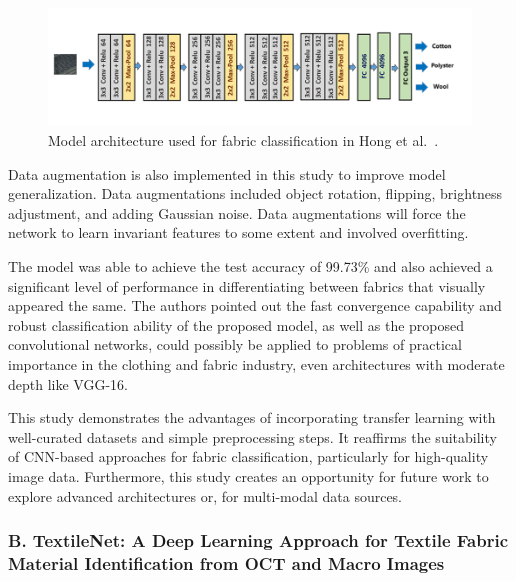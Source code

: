 \begin{figure}[H]
    \centering
    \begin{minipage}{1\linewidth}
        \includegraphics[width=\linewidth]{images/Paper1Model.png}
    \end{minipage}
    \caption[Model architecture - Hong et al.~\cite{hong2024research}]{Model architecture used for fabric classification in Hong et al.~\cite{hong2024research}.}
\end{figure}

Data augmentation is also implemented in this study to improve model generalization. Data augmentations included object rotation, flipping, brightness adjustment, and adding Gaussian noise. Data augmentations will force the network to learn invariant features to some extent and involved overfitting.

The model was able to achieve the test accuracy of 99.73\% and also achieved a significant level of performance in differentiating between fabrics that visually appeared the same. The authors pointed out the fast convergence capability and robust classification ability of the proposed model, as well as the proposed convolutional networks, could possibly be applied to problems of practical importance in the clothing and fabric industry, even architectures with moderate depth like VGG-16.

This study demonstrates the advantages of incorporating transfer learning with well-curated datasets and simple preprocessing steps. It reaffirms the suitability of CNN-based approaches for fabric classification, particularly for high-quality image data. Furthermore, this study creates an opportunity for future work to explore advanced architectures or, for multi-modal data sources.

\subsubsection[B. TextileNet: A Deep Learning Approach for Textile Fabric Material Identification from OCT and Macro Images]{B. TextileNet: A Deep Learning Approach for Textile Fabric Material Identification from OCT and Macro Images~\cite{siam2023textilenet}}

